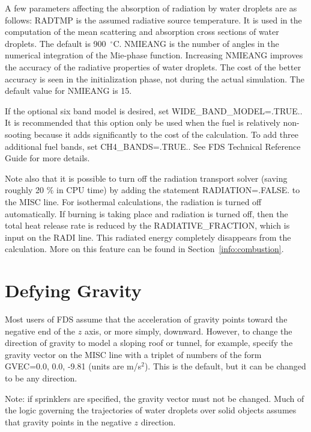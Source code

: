 \documentclass[11pt]{book}
\begin{document}
A few parameters affecting the absorption of radiation by water
droplets are as follows: {\ct RADTMP} is the assumed radiative source temperature.
It is used in the computation of the mean scattering
and absorption cross sections of water droplets. The default is 900~$^\circ$C.
{\ct NMIEANG} is the number of angles in the numerical integration of the Mie-phase function.
Increasing {\ct NMIEANG} improves the accuracy
of the radiative properties of water droplets. The cost
of the better accuracy is seen in the initialization phase,
not during the actual simulation. The default value for {\ct NMIEANG}
is 15.

If the optional six band model is desired,
set {\ct WIDE\_BAND\_MODEL=.TRUE.}. It is recommended that this option
only be used when the fuel is relatively non-sooting because it
adds significantly to the cost of the calculation. To add three
additional fuel bands, set {\ct CH4\_BANDS=.TRUE.}. See FDS Technical
Reference Guide for more details.

Note also that it is possible to turn off the radiation transport
solver (saving roughly 20 \% in CPU time) by adding the statement
{\ct RADIATION=.FALSE.} to the {\ct MISC} line. For isothermal
calculations, the radiation is turned off automatically. If burning
is taking place and radiation is turned off, then the total heat
release rate is reduced by the {\ct RADIATIVE\_FRACTION}, which is
input on the {\ct RADI} line. This radiated energy completely
disappears from the calculation. More on this feature can be found in
Section~\ref{info:combustion}.



\section{Defying Gravity}
\label{info:GVEC}

Most users of FDS assume that the acceleration of gravity points toward
the negative end of the $z$ axis, or more simply, downward.
However, to change the direction of gravity to model
a sloping roof or tunnel, for example, specify the gravity
vector on the {\ct MISC} line with a triplet of numbers of the form
{\ct GVEC=0.0, 0.0, -9.81} (units are m/s$^2$). This is the default, but it
can be changed to be any direction.

Note: if sprinklers are specified, the gravity vector must not be
changed. Much of the logic governing the trajectories of water droplets
over solid objects assumes that gravity points in the negative $z$
direction.
\end{document}
